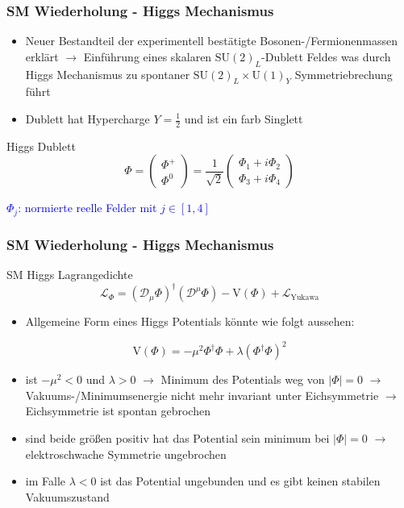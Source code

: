 \documentclass[xcolor=dvipsnames]{beamer}
\begin{document}
\begin{frame}
\frametitle{SM Wiederholung - Higgs Mechanismus }
\begin{itemize}
\item Neuer Bestandteil der experimentell bestätigte Bosonen-/Fermionenmassen erklärt $\rightarrow$ Einführung eines skalaren $\text{SU}(2)_{L}$-Dublett Feldes was durch Higgs Mechanismus zu spontaner $\text{SU}(2)_{L}\times\text{U}(1)_{Y}$ Symmetriebrechung führt
\item Dublett hat Hypercharge $Y=\frac{1}{2}$ und ist ein farb Singlett 
\end{itemize}

\begin{block}{Higgs Dublett}
\begin{equation*}
\Phi=\left( \begin{array}{c} \Phi^{+}\\ \Phi^{0} \end{array}\right)= \frac{1}{\sqrt{2}}\left( \begin{array}{c} \Phi_{1}+i\Phi_{2}\\ \Phi_{3}+i\Phi_{4} \end{array}\right)
\end{equation*}
\end{block}
\textcolor{Blue}{$\Phi_{j}$:  normierte reelle  Felder mit  $j \in [1,4] $}
\end{frame}

\begin{frame}
\frametitle{SM Wiederholung - Higgs Mechanismus }

\begin{block}{SM Higgs Lagrangedichte}
\begin{equation*}
\mathscr{L}_{\Phi}=(\mathscr{D}_{\mu}\Phi)^{\dagger}(\mathscr{D}^{\mu}\Phi) - \text{V}(\Phi) + \mathscr{L}_{\text{Yukawa}}
\end{equation*}
\end{block}
\begin{itemize}
\item  Allgemeine Form eines Higgs Potentials könnte wie folgt aussehen:
\end{itemize}
\begin{equation*}
 \text{V}(\Phi)=-\mu^{2} \Phi^{\dagger}\Phi +\lambda ( \Phi^{\dagger}\Phi)^{2}
\end{equation*}

\begin{itemize}
\item ist $-\mu^{2}<0$ und $\lambda>0$  $\rightarrow$ Minimum des Potentials weg von $|\Phi|=0$ $\rightarrow$ Vakuums-/Minimumsenergie nicht mehr invariant unter Eichsymmetrie $\rightarrow$ Eichsymmetrie ist spontan gebrochen
\item sind beide größen positiv hat das Potential sein minimum bei  $|\Phi|=0$ $ \rightarrow$ elektroschwache Symmetrie ungebrochen
\item im Falle $\lambda<0$ ist das Potential ungebunden und es gibt keinen stabilen Vakuumszustand
\end{itemize}
\end{frame}
\end{document}
